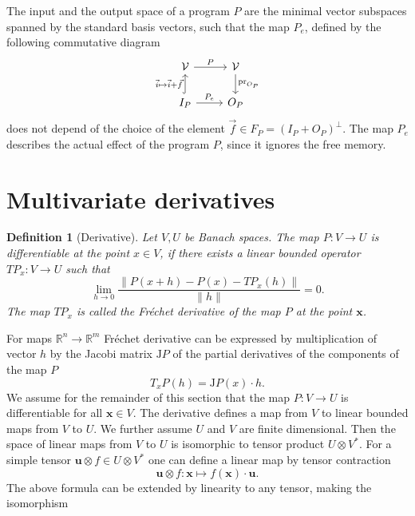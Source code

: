 \documentclass[preprint,12pt]{elsarticle}
\newcommand{\RR}{\mathbb{R}}
\newcommand{\VV}{\mathcal{V}}
\newcommand{\x}{\mathbf{x}}
\newcommand{\uu}{\mathbf{u}}
\newtheorem{definicija}{Definition}[section]
\begin{document}
The input and the output space of a program $P$ are the minimal
vector subspaces spanned by the standard basis vectors, such that the map $P_e$, 
defined by the following commutative diagram 
\begin{equation} 
    \label{eq:induced_map}
\begin{tikzcd}
  \VV \arrow{r}{P} & 
  \VV \arrow{d}{\mathrm{pr}_{O_P}}\\
  I_P \arrow[hook]{u}{\vec{i}\mapsto \vec{i}+\vec{f}} 
  \arrow{r}{P_e}& O_P
\end{tikzcd}
  \end{equation}
does not depend of the choice of the element 
$\vec{f}\in F_P=(I_P+O_P)^\perp$. The map $P_e$ describes the actual effect of the
program $P$, since it ignores the free memory. 
\section{Multivariate derivatives}
\begin{definicija}[Derivative]
  Let $V,U$ be Banach spaces. The map $P:V\to U$ is differentiable at the point
  $x\in V$, if there exists a linear bounded operator $TP_x:V\to U$ such that
  \begin{equation}
    \label{eq:frechet}
    \lim_{h\to 0}\frac{\|P(x+h)-P(x)-TP_x(h)\|}{\|h\|} = 0.
  \end{equation}
  The map $TP_x$ is called the \emph{Fréchet derivative} of the map $P$ at the
  point $\x$.
\end{definicija}
For maps $\RR^n\to \RR^m$ Fréchet derivative can be expressed by multiplication
of vector $h$ by the Jacobi matrix $\mathrm{J} P$ of the  partial derivatives of the 
components of the map $P$
\begin{equation*}
  T_xP(h) = \mathrm{J} P(x)\cdot h.
\end{equation*}
We assume for the remainder of this section that the map $P:V\to U$ is
differentiable for all $\x\in V$. The derivative defines a map from $V$ to
linear bounded maps from $V$ to $U$. We further assume $U$ and $V$ are finite
dimensional. Then the space of linear maps from $V$ to $U$ is isomorphic to
tensor product $U\otimes V^*$. For a simple tensor $\uu\otimes f\in U\otimes
V^*$ one can define a linear map by tensor contraction 
 \begin{equation}
   \label{eq:lin_tenzor}
   \uu\otimes f:\x \mapsto f(\x)\cdot \uu.
 \end{equation}
The above formula can be extended by linearity to any tensor, making the isomorphism
\end{document}
